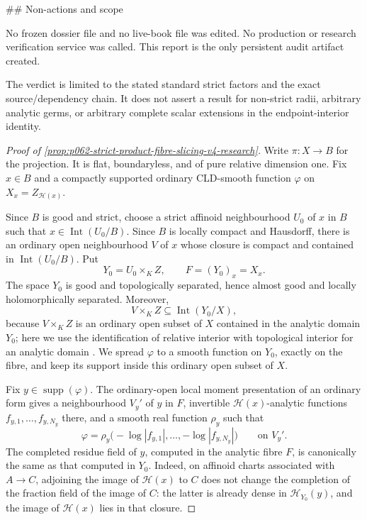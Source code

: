 ## Non-actions and scope

No frozen dossier file and no live-book file was edited.  No production or
research verification service was called.  This report is the only persistent
audit artifact created.

The verdict is limited to the stated standard strict factors and the exact
source/dependency chain.  It does not assert a result for non-strict radii,
arbitrary analytic germs, or arbitrary complete scalar extensions in the
endpoint-interior identity.


\begin{proof}[Proof of
\cref{prop:p062-strict-product-fibre-slicing-v4-research}]
Write \(\pi\colon X\to B\) for the projection.  It is flat,
boundaryless, and of pure relative dimension one.  Fix \(x\in B\) and a
compactly supported ordinary CLD-smooth function \(\varphi\) on
\(
 X_x=Z_{\mathscr H(x)}
\).

Since \(B\) is good and strict, choose a strict affinoid neighbourhood
\(U_0\) of \(x\) in \(B\) such that
\(
 x\in\operatorname{Int}(U_0/B)
\).  Since \(B\) is locally compact and Hausdorff, there is an ordinary
open neighbourhood \(V\) of \(x\) whose closure is compact and contained
in \(\operatorname{Int}(U_0/B)\).  Put
\[
                         Y_0=U_0\times_KZ,
                         \qquad F=(Y_0)_x=X_x.
\]
The space \(Y_0\) is good and topologically separated, hence almost good
and locally holomorphically separated.  Moreover,
\begin{equation}\label{eq:p062-endpoint-relative-interior-support-v4-research}
 V\times_KZ\subseteq\operatorname{Int}(Y_0/X),
\end{equation}
because \(V\times_KZ\) is an ordinary open subset of \(X\) contained in
the analytic domain \(Y_0\); here we use the identification of relative
interior with topological interior for an analytic domain
\cite[Proposition~1.5.5(i)]{Berk93}.  We spread \(\varphi\) to a smooth
function on \(Y_0\), exactly on the fibre, and keep its support inside this
ordinary open subset of \(X\).

Fix \(y\in\operatorname{supp}(\varphi)\).  The ordinary-open local moment
presentation of an ordinary form
\cite[Proposition~15.1.1(b)]{CLD25} gives a neighbourhood \(V_y'\) of \(y\) in
\(F\), invertible \(\mathscr H(x)\)-analytic functions
\(f_{y,1},\ldots,f_{y,N_y}\) there, and a smooth real function \(\rho_y\)
such that
\[
 \varphi=\rho_y\bigl(-\log|f_{y,1}|,\ldots,
                         -\log|f_{y,N_y}|\bigr)
 \qquad\text{on }V_y'.
\]
The completed residue field of \(y\), computed in the analytic fibre
\(F\), is canonically the same as that computed in \(Y_0\).  Indeed, on
affinoid charts associated with \(A\to C\), adjoining the image of
\(\mathscr H(x)\) to \(C\) does not change the completion of the fraction
field of the image of \(C\): the latter is already dense in
\(\mathscr H_{Y_0}(y)\), and the image of \(\mathscr H(x)\) lies in that
closure.


\end{proof}
